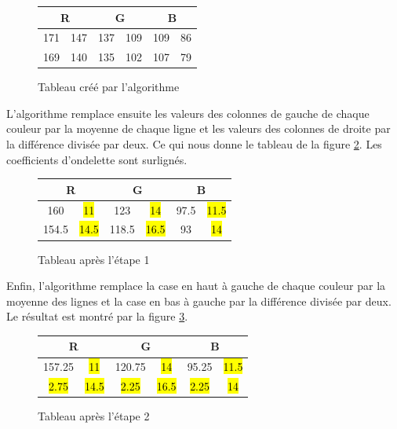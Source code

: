 \documentclass{article}
\begin{document}
\begin{figure}[!h]
\begin{center}
\begin{tabular}{|c|c|c|c|c|c|}
\hline
\multicolumn{2}{|c|}{R} & \multicolumn{2}{|c|}{G}  & \multicolumn{2}{|c|}{B} \\
\hline
171    & 147   &   137  & 109 &   109  & 86   \\ 
\hline
169    & 140   &   135  & 102 &   107  & 79 \\
\hline
\end{tabular}
\end{center}
\caption{Tableau créé par l'algorithme}
\label{tab1}
\end{figure}


L'algorithme remplace ensuite les valeurs des colonnes de gauche de chaque couleur par la moyenne  de chaque ligne et les valeurs des colonnes de droite par la différence divisée par deux. Ce qui nous donne le tableau de la figure \ref{tab2}. Les coefficients d'ondelette sont surlignés.

\begin{figure}[!h]
\begin{center}
\begin{tabular}{|c|c|c|c|c|c|}
\hline
\multicolumn{2}{|c|}{R} & \multicolumn{2}{|c|}{G}  & \multicolumn{2}{|c|}{B} \\
\hline
160    & \hl{11}   &   123  & \hl{14} &   97.5  & \hl{11.5}   \\ 
\hline
154.5    & \hl{14.5}   &   118.5  & \hl{16.5} &   93  & \hl{14} \\
\hline
\end{tabular}
\end{center}
\caption{Tableau après l'étape 1}
\label{tab2}
\end{figure}


Enfin, l'algorithme remplace la case en haut à gauche de chaque couleur par la moyenne des lignes et la case en bas à gauche par la différence divisée par deux. Le résultat est montré par la figure \ref{tab3}.

\begin{figure}[!h]
\begin{center}
\begin{tabular}{|c|c|c|c|c|c|}
\hline
\multicolumn{2}{|c|}{R} & \multicolumn{2}{|c|}{G}  & \multicolumn{2}{|c|}{B} \\
\hline
157.25    & \hl{11}   &   120.75  & \hl{14} &   95.25  & \hl{11.5}   \\ 
\hline
\hl{2.75}    & \hl{14.5}   &   \hl{2.25}  & \hl{16.5} &   \hl{2.25}  & \hl{14} \\
\hline
\end{tabular}
\end{center}
\caption{Tableau après l'étape 2}
\label{tab3}
\end{figure}
\end{document}
